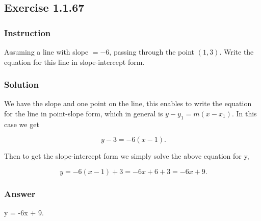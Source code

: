 \subsection*{Exercise 1.1.67}

\subsubsection*{Instruction}

Assuming a line with slope $ = -6 $, passing through the point $ (1, 3) $. Write the equation for this line in slope-intercept form.

\subsubsection*{Solution}

We have the slope and one point on the line, this enables to write the equation for the line in point-slope form, which in general is $ y - y_1 = m(x - x_1) $. In this case we get

\[ \phantom{.} y - 3 = -6(x - 1) \text{.} \]

Then to get the slope-intercept form we simply solve the above equation for y,

\[ \phantom{.} y = -6(x - 1) + 3 = -6x + 6 + 3 = -6x + 9 \text{.} \]

\subsubsection*{Answer}

y = -6x + 9.
